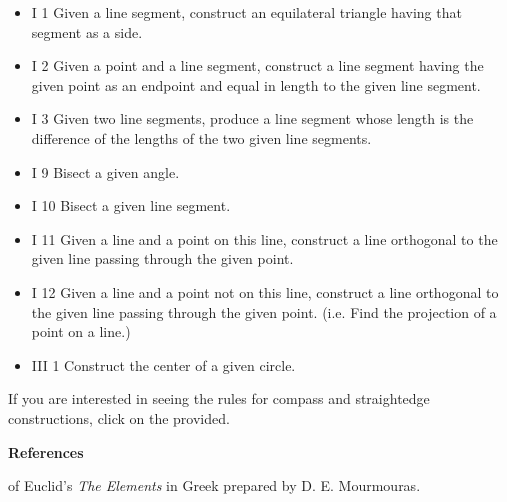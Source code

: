 \documentclass[12pt]{article}
\theoremstyle{definition}
\begin{document}
\begin{itemize}
\item I 1 Given a line segment, construct an equilateral triangle having that segment as a side.
\item I 2 Given a point and a line segment, construct a line segment having the given point as
an endpoint and equal in length to the given line segment.
\item I 3 Given two line segments, produce a line segment whose length is the difference of
the lengths of the two given line segments.
\item I 9 Bisect a given angle.
\item I 10 Bisect a given line segment.
\item I 11 Given a line and a point on this line, construct a line orthogonal to the given
line passing through the given point.
\item I 12 Given a line and a point not on this line, construct a line orthogonal to the given
line passing through the given point.  (i.e. Find the projection of a point on a line.)
\item III 1 Construct the center of a given circle.
\end{itemize}

If you are interested in seeing the rules for compass and straightedge constructions, click on the  provided.

\textbf{References}

 of Euclid's \emph{The Elements} 
in Greek prepared by D. E. Mourmouras.
\end{document}
